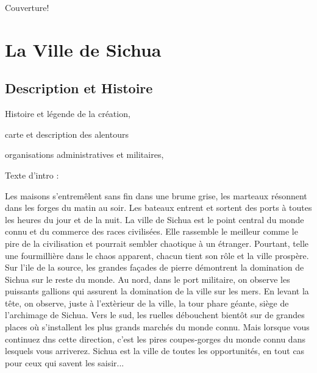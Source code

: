 \documentclass{dd}
\begin{document}
Couverture!

\clearpage

\tableofcontents

\part{La Ville de Sichua}

\chapter{Description et Histoire}

Histoire et légende de la création, 

carte et description des alentours

organisations administratives et militaires, 
%

Texte d'intro :

Les maisons s'entremêlent sans fin dans une brume grise, les marteaux résonnent
dans les forges du matin au soir. Les bateaux entrent et sortent 
des ports à toutes les heures du jour et de la nuit. La ville de Sichua est le point central 
du monde connu et du commerce des races civilisées. Elle rassemble le meilleur
comme le pire de la civilisation et pourrait sembler chaotique à un étranger.
Pourtant, telle une fourmillière dans le chaos apparent, chacun tient son rôle
et la ville prospère. Sur l'ile de la source, les grandes façades de pierre
démontrent la domination de Sichua sur le reste du monde. Au nord, dans le port 
militaire, on observe les puissants gallions qui assurent la domination de la ville 
sur les mers. En levant la tête, on observe, juste à l'extèrieur de la ville, la
tour phare géante, siège de l'archimage de Sichua. Vers le sud, les ruelles
débouchent bientôt sur de grandes places où s'installent les plus grands marchés 
du monde connu. Mais lorsque vous continuez dns cette direction, c'est les pires
coupes-gorges du monde connu dans lesquels vous arriverez. Sichua est la ville 
de toutes les opportunités, en tout cas pour ceux qui savent les saisir...
\end{document}
